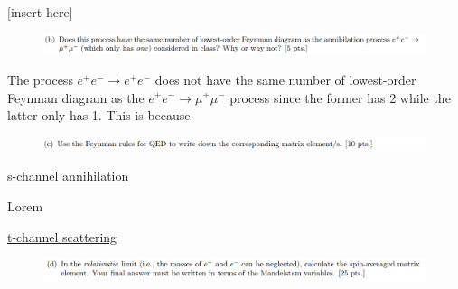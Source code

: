 \documentclass[11pt]{article}
\theoremstyle{definition}
\numberwithin{equation}{section}
\begin{document}
[insert here]



\newpage



\begin{figure}[H]
    \centering
    \includegraphics[scale = 0.4]{1b.png}
\end{figure}

The process $e^+e^- \to e^+e^-$ does not have the same number of lowest-order Feynman diagram as the $e^+e^- \to \mu^+\mu^-$ process since the former has 2 while the latter only has 1. This is because


\newpage



\begin{figure}[H]
    \centering
    \includegraphics[scale = 0.4]{1c.png}
\end{figure}

\underline{s-channel annihilation}

Lorem

\underline{t-channel scattering}


\newpage


\begin{figure}[H]
    \centering
    \includegraphics[scale = 0.4]{1d.png}
\end{figure}
\end{document}
